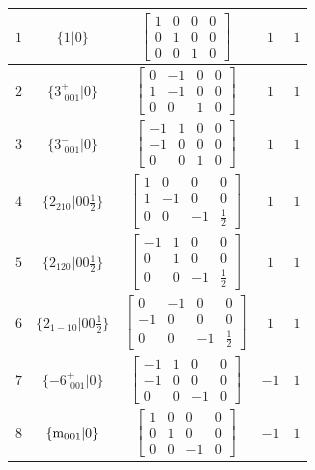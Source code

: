 \documentclass[fleqn,8pt]{jsarticle}
\begin{document}
\begin{longtable}{ccccc}
$ 1 $ & $ \{1|0\} $ & $ \begin{bmatrix} 1 & 0 & 0 & 0 \\ 0 & 1 & 0 & 0 \\ 0 & 0 & 1 & 0 \end{bmatrix} $ & $ 1 $ & $ 1 $ \\ \hline
$ 2 $ & $ \{3^{+}_{\,\,001}|0\} $ & $ \begin{bmatrix} 0 & -1 & 0 & 0 \\ 1 & -1 & 0 & 0 \\ 0 & 0 & 1 & 0 \end{bmatrix} $ & $ 1 $ & $ 1 $ \\ \hline
$ 3 $ & $ \{3^{-}_{\,\,001}|0\} $ & $ \begin{bmatrix} -1 & 1 & 0 & 0 \\ -1 & 0 & 0 & 0 \\ 0 & 0 & 1 & 0 \end{bmatrix} $ & $ 1 $ & $ 1 $ \\ \hline
$ 4 $ & $ \{2{}_{210}|0 0 \frac{1}{2}\} $ & $ \begin{bmatrix} 1 & 0 & 0 & 0 \\ 1 & -1 & 0 & 0 \\ 0 & 0 & -1 & \frac{1}{2} \end{bmatrix} $ & $ 1 $ & $ 1 $ \\ \hline
$ 5 $ & $ \{2{}_{120}|0 0 \frac{1}{2}\} $ & $ \begin{bmatrix} -1 & 1 & 0 & 0 \\ 0 & 1 & 0 & 0 \\ 0 & 0 & -1 & \frac{1}{2} \end{bmatrix} $ & $ 1 $ & $ 1 $ \\ \hline
$ 6 $ & $ \{2{}_{1-10}|0 0 \frac{1}{2}\} $ & $ \begin{bmatrix} 0 & -1 & 0 & 0 \\ -1 & 0 & 0 & 0 \\ 0 & 0 & -1 & \frac{1}{2} \end{bmatrix} $ & $ 1 $ & $ 1 $ \\ \hline
$ 7 $ & $ \{-6^{+}_{\,\,001}|0\} $ & $ \begin{bmatrix} -1 & 1 & 0 & 0 \\ -1 & 0 & 0 & 0 \\ 0 & 0 & -1 & 0 \end{bmatrix} $ & $ -1 $ & $ 1 $ \\ \hline
$ 8 $ & $ \{{\rm m}_{001}|0\} $ & $ \begin{bmatrix} 1 & 0 & 0 & 0 \\ 0 & 1 & 0 & 0 \\ 0 & 0 & -1 & 0 \end{bmatrix} $ & $ -1 $ & $ 1 $ \\ \hline

\end{longtable}
\end{document}
